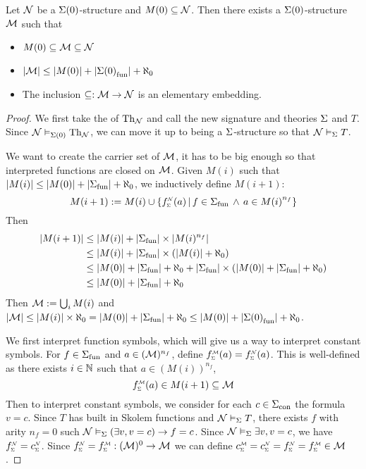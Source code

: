 \begin{prop}
    Let $\mathcal{N}$ be a $\Sigma(0)$-structure and $M(0) \subseteq {\mathcal{N}}$.
    Then there exists a $\Sigma(0)$-structure $\mathcal{M}$ such that 
    \begin{itemize}
        \item $M(0) \subseteq {\mathcal{M}} \subseteq {\mathcal{N}}$
        \item $|{\mathcal{M}}| \leq |M(0)| + |{\Sigma(0)}_\mathrm{fun}| + \aleph_0$
        \item The inclusion $\subseteq : \mathcal{M} \to \mathcal{N}$ is an elementary embedding.
    \end{itemize}
\end{prop}
\begin{proof}
    We first take the  
    of $\mathrm{Th}_{\mathcal{N}}$ and call the new signature and theories 
    $\Sigma$ and $T$.
    Since $\mathcal{N} \vDash_{\Sigma(0)} \mathrm{Th}_{\mathcal{N}}$, 
    we can move it up to being a $\Sigma$-structure so that 
    $\mathcal{N} \vDash_{\Sigma} T$.

    We want to create the carrier set of $\mathcal{M}$,
    it has to be big enough so that interpreted functions are closed on $\mathcal{M}$.
    Given $M(i)$ such that $|M(i)| \leq |M(0)| + |{\Sigma}_\mathrm{fun}| + \aleph_0$, 
    we inductively define $M(i+1)$:
    \[
        M(i+1) := M(i) \cup \set{\subintp{\Si}{\NN}{f}(a) 
        \st f \in \func{\Si} \AND a \in {M(i)}^{n_f}}
    \]
    Then \begin{align*}
        |M(i+1)| &\leq |M(i)| + |{\Sigma}_\mathrm{fun}| \times |M(i)^{n_f}|\\
        &\leq |M(i)| + |{\Sigma}_\mathrm{fun}| \times (|M(i)| + \aleph_0)\\
        &\leq |M(0)| + |{\Sigma}_\mathrm{fun}| + \aleph_0 + |{\Sigma}_\mathrm{fun}| 
        \times (|M(0)| + |{\Sigma}_\mathrm{fun}| + \aleph_0)\\
        &\leq |M(0)| + |{\Sigma}_\mathrm{fun}| + \aleph_0
    \end{align*}
    Then ${\mathcal{M}} := \bigcup_{i} M(i)$ and 
    $|{\mathcal{M}}| \leq |M(i)| \times \aleph_0 =
    |M(0)| + |{\Sigma}_\mathrm{fun}| + \aleph_0 
    \leq |M(0)| + |{\Sigma(0)}_\mathrm{fun}| + \aleph_0$.

    We first interpret function symbols, 
    which will give us a way to interpret constant symbols. 
    For $f \in {\Sigma}_\mathrm{fun}$ and $a \in ({\mathcal{M}})^{n_f}$,
    define $\subintp{\Si}{\MM}{f}(a) = \subintp{\Si}{\NN}{f}(a)$.
    This is well-defined as there exists 
    $i \in \mathbb{N}$ such that $a \in (M(i))^{n_f}$,
    \[\subintp{\Si}{\MM}{f}(a) \in M(i+1) \subs {\MM}\]
    Then to interpret constant symbols,
    we consider for each $c \in {\Sigma}_\mathrm{con}$ the formula $v = c$.
    Since $T$ has built in Skolem functions and $\mathcal{N} \vDash_{\Sigma} T$, 
    there exists $f$ with arity $n_f = 0$ such
    $\mathcal{N} \vDash_{\Sigma} (\exists v, v = c) \to f = c$.
    Since $\mathcal{N} \vDash_{\Sigma} \exists v, v = c$, 
    we have $\subintp{\Si}{\NN}{f} = \subintp{\Si}{\NN}{c}$.
    Since $\subintp{\Si}{\NN}{f} = \subintp{\Si}{\MM}{f} : 
        ({\MM})^0 \to {\MM}$ 
    we can define $\subintp{\Si}{\MM}{c} = \subintp{\Si}{\NN}{c} = 
        \subintp{\Si}{\NN}{f} = \subintp{\Si}{\MM}{f} \in {\MM}$.
    

\end{proof}
